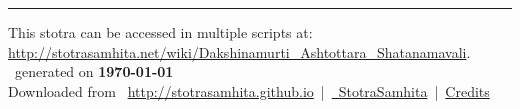 \documentclass[oneside,12pt]{book}
\begin{document}
\setmainfont[Script=Devanagari,Mapping=tex-text]{Sanskrit 2003}
\fontsize {16}{19.25}\selectfont
\begin{center}

\end{center}
\vfill
\centering
\rule{0.8\textwidth}{0.6pt}

\footnotesize
{}\sffamily
This stotra can be accessed in multiple scripts at:\\
\url{http://stotrasamhita.net/wiki/Dakshinamurti_Ashtottara_Shatanamavali}.\\[1ex]
\faFilePdfO~generated on \textbf{\today}\\[1ex]
Downloaded from \faGlobe{}~\url{http://stotrasamhita.github.io}~|~\href{https://github.com/StotraSamhita}{\faGithubSquare{}~StotraSamhita}~|~\href{https://stotrasamhita.github.io/about/}{Credits}
\end{document}

